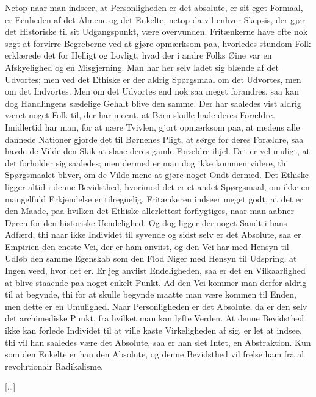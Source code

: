 \documentclass[12pt,a4paper]{article}
\begin{document}
Netop naar man indseer, at Personligheden er det absolute, er sit eget Formaal, er Eenheden af det Almene og det Enkelte, netop da vil enhver Skepsis, der gjør det Historiske til sit Udgangspunkt, være overvunden. Fritænkerne have ofte nok søgt at forvirre Begreberne ved at gjøre opmærksom paa, hvorledes stundom Folk erklærede det for Helligt og Lovligt, hvad der i andre Folks Øine var en Afskyelighed og en Misgjerning. Man har her selv ladet sig blænde af det Udvortes; men ved det Ethiske er der aldrig Spørgsmaal om det Udvortes, men om det Indvortes. Men om det Udvortes end nok saa meget forandres, saa kan dog Handlingens sædelige Gehalt blive den samme. Der har saaledes vist aldrig været noget Folk til, der har meent, at Børn skulle hade deres Forældre. Imidlertid har man, for at nære Tvivlen, gjort opmærksom paa, at medens alle dannede Nationer gjorde det til Børnenes Pligt, at sørge for deres Forældre, saa havde de Vilde den Skik at slaae deres gamle Forældre ihjel. Det er vel muligt, at det forholder sig saaledes; men dermed er man dog ikke kommen videre, thi Spørgsmaalet bliver, om de Vilde mene at gjøre noget Ondt dermed. Det Ethiske ligger altid i denne Bevidsthed, hvorimod det er et andet Spørgsmaal, om ikke en mangelfuld Erkjendelse er tilregnelig. Fritænkeren indseer meget godt, at det er den Maade, paa hvilken det Ethiske allerlettest forflygtiges, naar man aabner Døren for den historiske Uendelighed. Og dog ligger der noget Sandt i hans Adfærd, thi naar ikke Individet til syvende og sidst selv er det Absolute, saa er Empirien den eneste Vei, der er ham anviist, og den Vei har med Hensyn til Udløb den samme Egenskab som den Flod Niger med Hensyn til Udspring, at Ingen veed, hvor det er. Er jeg anviist Endeligheden, saa er det en Vilkaarlighed at blive staaende paa noget enkelt Punkt. Ad den Vei kommer man derfor aldrig til at begynde, thi for at skulle begynde maatte man være kommen til Enden, men dette er en Umulighed. Naar Personligheden er det Absolute, da er den selv det archimediske Punkt, fra hvilket man kan løfte Verden. At denne Bevidsthed ikke kan forlede Individet til at ville kaste Virkeligheden af sig, er let at indsee, thi vil han saaledes være det Absolute, saa er han slet Intet, en Abstraktion. Kun som den Enkelte er han den Absolute, og denne Bevidsthed vil frelse ham fra al revolutionair Radikalisme.

[…]
\end{document}
